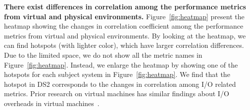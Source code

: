\noindent \textbf{There exist differences in correlation among the performance metrics from virtual and physical environments.} Figure~\ref{fig:heatmap} present the heatmap showing the changes in correlation coefficient among the performance metrics from virtual and physical environments. By looking at the heatmap, we can find hotspots (with lighter color), which have larger correlation differences. Due to the limited space, we do not show all the metric names in Figure~\ref{fig:heatmap}. Instead, we enlarge the heatmap by showing one of the hotspots for each subject system in Figure~\ref{fig:heatmap}. We find that the hotspot in DS2 corresponds to the changes in correlation among I/O related metrics. Prior research on virtual machines has similar findings about I/O overheads in virtual machines~\cite{menon2005diagnosing,kraft2011io}.






